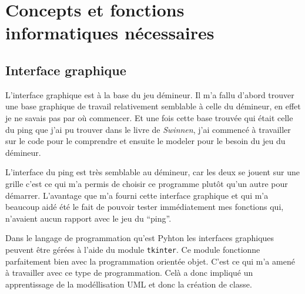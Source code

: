 \documentclass[a4paper,11pt]{article}
\newcommand{\ml}[0]{\par\noindent}
\begin{document}
\section{Concepts et fonctions informatiques nécessaires}
\subsection{Interface graphique}
L'interface graphique est à la base du jeu démineur. Il m'a fallu d'abord trouver une base graphique de travail relativement
semblable à celle du démineur, en effet je ne savais pas par où commencer. Et une fois cette base trouvée qui était celle
du ping que j'ai pu trouver dans le livre de {\em Swinnen}, j'ai commencé à travailler sur le code pour le comprendre et ensuite le
modeler pour le besoin du jeu du démineur.
\ml
L'interface du ping est très semblable au démineur, car les deux se jouent sur une grille c'est ce qui m'a permis de choisir ce programme
plutôt qu'un autre pour démarrer. L'avantage que m'a fourni cette interface graphique et qui m'a beaucoup aidé été le fait de pouvoir 
tester immédiatement mes fonctions qui, n'avaient aucun rapport avec le jeu du ``ping''.
\ml
Dans le langage de programmation qu'est Pyhton les interfaces graphiques peuvent être gérées à l'aide du module {\tt tkinter}. Ce module
fonctionne parfaitement bien avec la programmation orientée objet. C'est ce qui m'a amené à travailler avec ce type de programmation. 
Celà a donc impliqué un apprentissage de la modéllisation UML et donc la création de classe.
\end{document}
